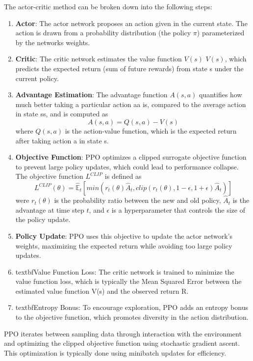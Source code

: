 The actor-critic method can be broken down into the following steps:
\begin{enumerate}
    \item \textbf{Actor}: The actor network proposes an action given in the current state. The action is drawn from a probability distribution (the policy $\pi$) parameterized by the networks weights.
    \item \textbf{Critic}: The critic network estimates the value function $V(s)$ $V(s)$, which predicts the expected return (sum of future rewards) from state s under the current policy.
    \item \textbf{Advantage Estimation}: The advantage function $A(s,a)$ quantifies how much better taking a particular action aa is, compared to the average action in state ss, and is computed as 
    \begin{equation}
        A(s,a) = Q(s,a) - V(s)
    \end{equation}
    where $Q(s,a)$ is the action-value function, which is the expected return after taking action a in state s.
    \item \textbf{Objective Function}:  PPO optimizes a clipped surrogate objective function to prevent large policy updates, which could lead to performance collapse. The objective function $L^{CLIP}$ is defined as
    \begin{equation}
        L^{CLIP}(\theta) = \hat{\mathbb{E}}_t[min(r_t(\theta)\hat{A}_t, clip(r_t(\theta), 1-\epsilon, 1+\epsilon)\hat{A}_t)]
    \end{equation}
    were $r_t(\theta)$ is the probability ratio between the new and old policy, $\hat{A}_t$ is the advantage at time step $t$, and $\epsilon$ is a hyperparameter that controls the size of the policy update.
    \item \textbf{Policy Update}: PPO uses this objective to update the actor network's weights, maximizing the expected return while avoiding too large policy updates.
    \item textbf{Value Function Loss}: The critic network is trained to minimize the value function loss, which is typically the Mean Squared Error between the estimated value function V(s) and the observed return R.
    \item textbf{Entropy Bonus}: To encourage exploration, PPO adds an entropy bonus to the objective function, which promotes diversity in the action distribution.
\end{enumerate}

PPO iterates between sampling data through interaction with the environment and optimizing the clipped objective function using stochastic gradient ascent. This optimization is typically done using minibatch updates for efficiency.

